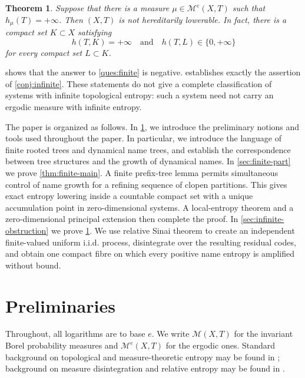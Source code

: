 \documentclass[12pt,letterpaper,reqno]{amsart}
\newtheorem{theorem}{Theorem}[section]
\theoremstyle{definition}
\theoremstyle{remark}
\numberwithin{equation}{section}
\begin{document}
	\begin{theorem}
		\label{thm:infinite-main}
		Suppose that there is a measure $\mu\in \mathcal{M}^e(X,T)$ such that
		$h_\mu(T)=+\infty$. Then $(X,T)$ is not hereditarily lowerable. In fact, there
		is a compact set $K\subset X$ satisfying
		\[
		h(T,K)=+\infty
		\quad\text{and}\quad
		h(T,L)\in\{0,+\infty\}
		\]
		for every compact set $L\subset K$.
	\end{theorem}
	
	 shows that the answer to \cref{ques:finite} is negative.
	 establishes exactly the assertion of
	\cref{conj:infinite}. These statements do not give a complete classification
	of systems with infinite topological entropy: such a system need not carry an
	ergodic measure with infinite entropy.
	
	The paper is organized as follows. 
	In \cref{sec:preliminaries}, we introduce the preliminary notions and tools used throughout the paper. In particular, we introduce the language of finite rooted trees and dynamical name trees, and establish the correspondence between tree structures and the growth of dynamical names. 
	In \cref{sec:finite-part} we prove
	\cref{thm:finite-main}. A finite prefix-tree lemma permits simultaneous control
	of name growth for a refining sequence of clopen partitions. This gives exact
	entropy lowering inside a countable compact set with a unique accumulation
	point in zero-dimensional systems. A local-entropy theorem and a zero-dimensional principal extension then
	complete the proof. In \cref{sec:infinite-obstruction} we prove \cref{thm:infinite-main}. We use 
	relative Sinai theorem to create an independent finite-valued uniform i.i.d. process, disintegrate
	over the resulting residual codes, and obtain one compact fibre on which every
	positive name entropy is amplified without bound.
	
	\section{Preliminaries}
	\label{sec:preliminaries}
	
	Throughout, all logarithms are to base $e$. We write $\mathcal{M}(X,T)$ for the invariant Borel
	probability measures and $\mathcal{M}^e(X,T)$ for the ergodic ones. Standard background
	on topological and measure-theoretic entropy may be found in
	\cite{Walters1982,Downarowicz2011}; background on measure disintegration and relative
	entropy may be found in \cite{Glasner2003,EinsiedlerWard2011}.
	
\end{document}
